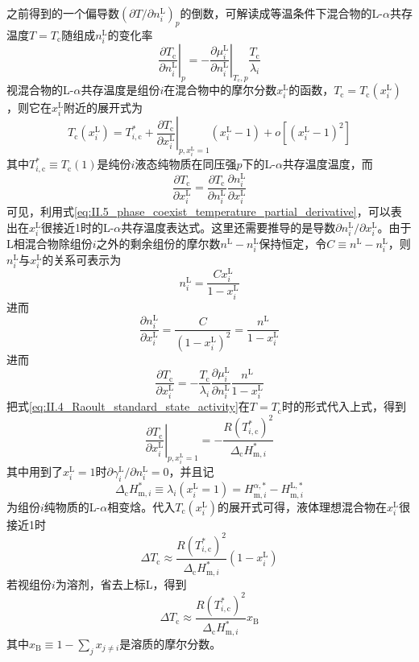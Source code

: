 \documentclass[main.tex]{subfiles}
\begin{document}
之前得到的一个偏导数$\left(\partial T/\partial n_i^\text{L}\right)_{p}$的倒数，可解读成等温条件下混合物的L-$\alpha$共存温度$T=T_\text{c}$随组成$n_i^\text{L}$的变化率
\begin{equation}\label{eq:II.5_phase_coexist_temperature_partial_derivative}
    \left.\frac{\partial T_\text{c}}{\partial n_i^\text{L}}\right|_{p}=-\left.\frac{\partial \mu_i^\text{L}}{\partial n_i^\text{L}}\right|_{T_\text{c},p}\frac{T_\text{c}}{\lambda_i}
\end{equation}
视混合物的L-$\alpha$共存温度是组份$i$在混合物中的摩尔分数$x_i^\text{L}$的函数，$T_\text{c}=T_\text{c}\left(x_i^\text{L}\right)$，则它在$x_i^\text{L}$附近的展开式为
\[T_\text{c}\left(x_i^\text{L}\right)=T_{i,\text{c}}^*+\left.\frac{\partial T_\text{c}}{\partial x_i^\text{L}}\right|_{p,x_i^\text{L}=1}\left(x_i^\text{L}-1\right)+o\left[\left(x_i^\text{L}-1\right)^2\right]\]
其中$T_{i,\text{c}}^*\equiv T_\text{c}\left(1\right)$是纯份$i$液态纯物质在同压强$p$下的L-$\alpha$共存温度温度，而
\[\frac{\partial T_\text{c}}{\partial x_i^\text{L}}=\frac{\partial T_\text{c}}{\partial n_i^\text{L}}\frac{\partial n_i^\text{L}}{\partial x_i^\text{L}}\]
可见，利用式\eqref{eq:II.5_phase_coexist_temperature_partial_derivative}，可以表出在$x_i^\text{L}$很接近1时的L-$\alpha$共存温度表达式。这里还需要推导的是导数$\partial n_i^\text{L}/\partial x_i^\text{L}$。由于L相混合物除组份$i$之外的剩余组份的摩尔数$n^\text{L}-n_i^\text{L}$保持恒定，令$C\equiv n^\text{L}-n_i^\text{L}$，则$n_i^\text{L}$与$x_i^\text{L}$的关系可表示为
\[n_i^\text{L}=\frac{Cx_i^\text{L}}{1-x_i^\text{L}}\]
进而
\[\frac{\partial n_i^\text{L}}{\partial x_i^\text{L}}=\frac{C}{\left(1-x_i^\text{L}\right)^2}=\frac{n^\text{L}}{1-x_i^\text{L}}\]
进而
\[\frac{\partial T_\text{c}}{\partial x_i^\text{L}}=-\frac{T_\text{c}}{\lambda_i}\frac{\partial\mu_i^\text{L}}{\partial n_i^\text{L}}\frac{n^\text{L}}{1-x_i^\text{L}}\]
把式\eqref{eq:II.4_Raoult_standard_state_activity}在$T=T_\text{c}$时的形式代入上式，得到
\[\left.\frac{\partial T_\text{c}}{\partial x_i^\text{L}}\right|_{p,x_i^\text{L}=1}=-\frac{R\left(T_{i,\text{c}}^*\right)^2}{\Delta_\text{c}H_{\text{m},i}^*}\]
其中用到了$x_i^\text{L}=1$时$\partial \gamma_i^\text{L}/\partial n_i^\text{L}=0$，并且记
\[\Delta_\text{c}H_{\text{m},i}^*\equiv\lambda_i\left(x_i^\text{L}=1\right)=H_{\text{m},i}^{\alpha,*}-H_{\text{m},i}^{\text{L},*}\]
为组份$i$纯物质的L-$\alpha$相变焓。代入$T_\text{c}\left(x_i^\text{L}\right)$的展开式可得，液体理想混合物在$x_i^\text{L}$很接近1时
\[\Delta T_\text{c}\approx\frac{R\left(T_{i,\text{c}}^*\right)^2}{\Delta_\text{c}H_{\text{m},i}^*}\left(1-x_i^\text{L}\right)\]
若视组份$i$为溶剂，省去上标L，得到
\[\Delta T_\text{c}\approx \frac{R\left(T_{i,\text{c}}^*\right)^2}{\Delta_\text{c}H_{\text{m},i}^*}x_\text{B}\]
其中$x_\text{B}\equiv 1-\sum_j x_{j\neq i}$是溶质的摩尔分数。
\end{document}
